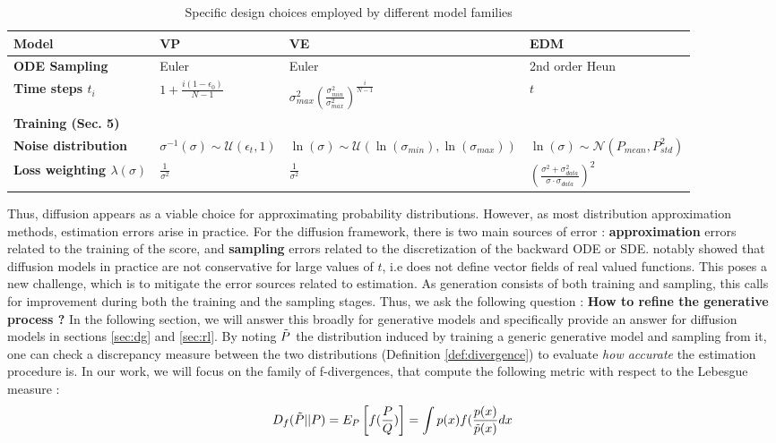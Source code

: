 \begin{table}[ht]
\centering
\caption{Specific design choices employed by different model families}
\begin{tabular}{@{}m{1.5cm}m{4cm}m{4cm}m{4cm}@{}}\label{tab:diffusion_table}
\toprule
\textbf{Model} & \textbf{VP} \citep{song2020generativemodelingestimatinggradients} & \textbf{VE} \citep{ho2020denoisingdiffusionprobabilisticmodels} & \textbf{EDM \citep{karras2022elucidatingdesignspacediffusionbased}} \\
\midrule
\textbf{ODE Sampling} & Euler & Euler & 2nd order Heun \\
\textbf{Time steps $t_i$} & $1+\frac{i(1-\epsilon_{0})}{N-1}$ & $\sigma^{2}_{max}\left(\frac{\sigma_{min}^2}{\sigma_{max}^2}\right)^{\frac{i}{N-1}}$ & $t$ \\
\midrule
\textbf{Training (Sec. 5)} & & & \\
\textbf{Noise distribution} & $\sigma^{-1}(\sigma) \sim \mathcal{U}(\epsilon_{t},1)$ & $\ln(\sigma) \sim \mathcal{U}(\ln(\sigma_{min}), \ln(\sigma_{max}))$ & $\ln(\sigma) \sim \mathcal{N}(P_{mean}, P_{std}^2)$ \\
\textbf{Loss weighting $\lambda(\sigma)$} & $\frac{1}{\sigma^2}$ & $\frac{1}{\sigma^2}$ & $\left(\frac{\sigma^2 + \sigma^2_{data}}{\sigma \cdot \sigma_{data}}\right)^2$ \\
\bottomrule
\end{tabular}
\end{table}
Thus, diffusion appears as a viable choice for approximating probability distributions. However, as most distribution approximation methods, estimation errors arise in practice. For the diffusion framework, there is two main sources of error : \textbf{approximation} errors related to the training of the score, and \textbf{sampling} errors related to the discretization of the backward ODE or SDE. \citep{lai2023fpdiffusionimprovingscorebaseddiffusion,chao2023investigatingconservativepropertyscorebased} notably showed that diffusion models in practice are not conservative for large values of $t$, i.e does not define vector fields of real valued functions.
This poses a new challenge, which is to mitigate the error sources related to estimation. As generation consists of both training and sampling, this calls for improvement during both the training and the sampling stages. Thus, we ask the following question : \textbf{How to refine the generative process ?} In the following section, we will answer this broadly for generative models and specifically provide an answer for diffusion models in sections \ref{sec:dg} and \ref{sec:rl}.
By noting $\Tilde{P}$ the distribution induced by training a generic generative model and sampling from it, one can check a discrepancy measure between the two distributions (Definition \ref{def:divergence}) to evaluate \textit{how accurate} the estimation procedure is. In our work, we will focus on the family of f-divergences, that compute the following metric with respect to the Lebesgue measure : 
\begin{equation}
    D_{f}(\Tilde{P}||P) = E_{P}\left[f(\frac{P}{Q})\right] = \int p(x)f(\frac{p(x)}{\Tilde{p}(x)}dx
\end{equation}
